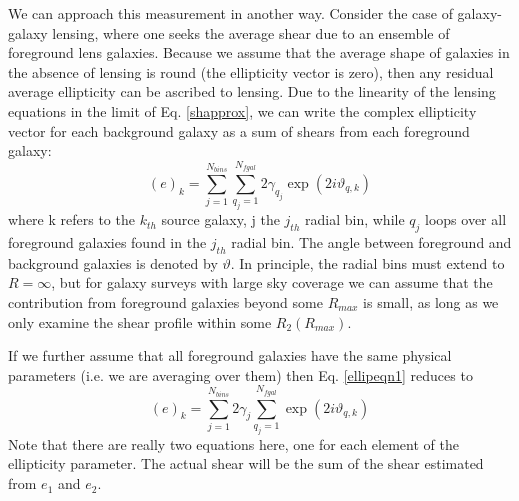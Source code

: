 \documentclass[preprint2]{aastex}
\def\rmax{$R_{max}$ }
\begin{document}
We can approach this measurement in another way.  Consider the case of
galaxy-galaxy lensing, where one seeks the average shear due to an ensemble of
foreground lens galaxies.  Because we assume that the average shape of galaxies
in the absence of lensing is round (the ellipticity vector is zero), then any
residual average ellipticity can be ascribed to lensing.  Due to the linearity 
of the lensing equations in the limit of Eq. \ref{shapprox}, we can write 
the complex ellipticity vector for each background galaxy as a sum of shears 
from each foreground galaxy:
\begin{equation} \label{ellipeqn1}
(e)_k = \sum_{j=1}^{N_{bins}}\sum_{q_j=1}^{N_{fgal}}2\gamma_{q_j}\exp(2i\vartheta_{q,k})
\end{equation}
where k refers to the $k_{th}$ source galaxy, j the $j_{th}$ radial bin, while
$q_j$ loops over all foreground galaxies found in the $j_{th}$ radial bin.  The
angle between foreground and background galaxies is denoted by $\vartheta$.  In
principle, the radial bins must extend to $R=\infty$, but for galaxy surveys
with large sky coverage we can assume that the contribution from foreground
galaxies beyond some \rmax is small, as long as we only examine the shear
profile within some $R_2(R_{max})$.

If we further assume that all foreground galaxies have the same physical
parameters (i.e. we are averaging over them) then Eq. \ref{ellipeqn1} reduces
to
\begin{equation} \label{ellipeqn2}
(e)_k = \sum_{j=1}^{N_{bins}}2\gamma_j\sum_{q_j=1}^{N_{fgal}}\exp(2i\vartheta_{q,k})
\end{equation}
Note that there are really two equations here, one for each element of the
ellipticity parameter.  
The actual shear will be the sum of the shear estimated from $e_1$ and
$e_2$.
\end{document}
